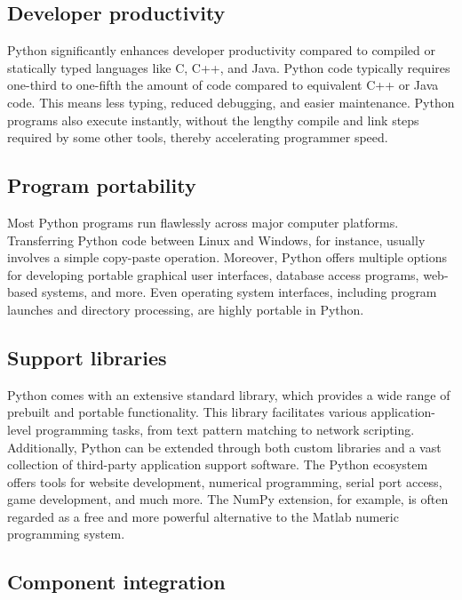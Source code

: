 \documentclass[12pt]{book}
\begin{document}
\subsection{Developer productivity}

Python significantly enhances developer productivity compared to compiled or statically typed languages like C, C++, and Java. Python code typically requires one-third to one-fifth the amount of code compared to equivalent C++ or Java code. This means less typing, reduced debugging, and easier maintenance. Python programs also execute instantly, without the lengthy compile and link steps required by some other tools, thereby accelerating programmer speed.

\subsection{Program portability}

Most Python programs run flawlessly across major computer platforms. Transferring Python code between Linux and Windows, for instance, usually involves a simple copy-paste operation. Moreover, Python offers multiple options for developing portable graphical user interfaces, database access programs, web-based systems, and more. Even operating system interfaces, including program launches and directory processing, are highly portable in Python.

\subsection{Support libraries}

Python comes with an extensive standard library, which provides a wide range of prebuilt and portable functionality. This library facilitates various application-level programming tasks, from text pattern matching to network scripting. Additionally, Python can be extended through both custom libraries and a vast collection of third-party application support software. The Python ecosystem offers tools for website development, numerical programming, serial port access, game development, and much more. The NumPy extension, for example, is often regarded as a free and more powerful alternative to the Matlab numeric programming system.

\subsection{Component integration}
\end{document}
